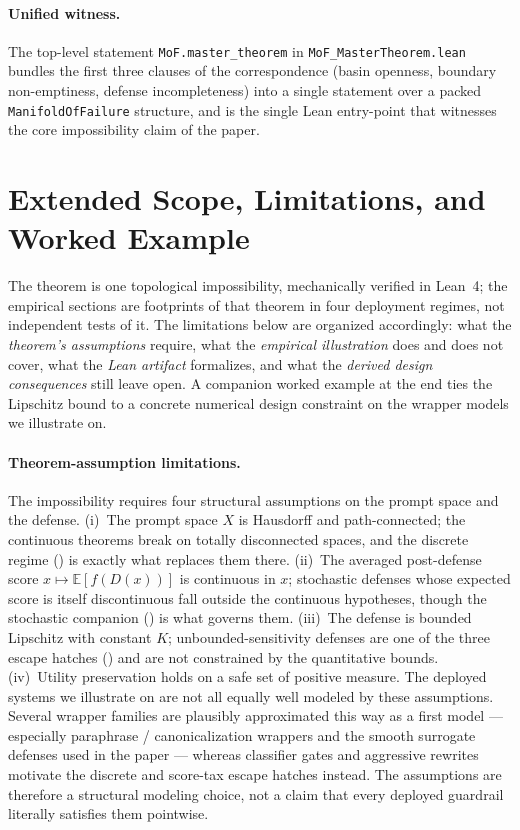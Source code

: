 \documentclass[11pt]{article}
\begin{document}
\paragraph{Unified witness.}
The top-level statement \texttt{MoF.master\_theorem} in
\texttt{MoF\_MasterTheorem.lean} bundles the first three clauses of
the correspondence (basin openness, boundary non-emptiness, defense
incompleteness) into a single statement over a packed
\texttt{ManifoldOfFailure} structure, and is the single Lean
entry-point that witnesses the core impossibility claim of the
paper.

\section{Extended Scope, Limitations, and Worked Example}
\label{app:extended-limitations}

The theorem is one topological impossibility, mechanically verified
in Lean~4; the empirical sections are footprints of that theorem in
four deployment regimes, not independent tests of it. The limitations
below are organized accordingly: what the \emph{theorem's assumptions}
require, what the \emph{empirical illustration} does and does not
cover, what the \emph{Lean artifact} formalizes, and what the
\emph{derived design consequences} still leave open. A companion
worked example at the end ties the Lipschitz bound to a concrete
numerical design constraint on the wrapper models we illustrate on.

\paragraph{Theorem-assumption limitations.}
The impossibility requires four structural assumptions on the prompt
space and the defense. (i)~The prompt space $X$ is Hausdorff and
path-connected; the continuous theorems break on totally disconnected
spaces, and the discrete regime () is exactly
what replaces them there. (ii)~The averaged post-defense score
$x \mapsto \mathbb{E}[f(D(x))]$ is continuous in $x$; stochastic
defenses whose expected score is itself discontinuous fall outside
the continuous hypotheses, though the stochastic companion
() is what governs them. (iii)~The defense is
bounded Lipschitz with constant $K$; unbounded-sensitivity defenses
are one of the three escape hatches ()
and are not constrained by the quantitative bounds. (iv)~Utility
preservation holds on a safe set of positive measure. The deployed
systems we illustrate on are not all equally well modeled by these
assumptions. Several wrapper families are plausibly approximated this
way as a first model --- especially paraphrase / canonicalization
wrappers and the smooth surrogate defenses used in the paper ---
whereas classifier gates and aggressive rewrites motivate the discrete
and score-tax escape hatches instead. The assumptions are therefore a
structural modeling choice, not a claim that every deployed guardrail
literally satisfies them pointwise.
\end{document}
